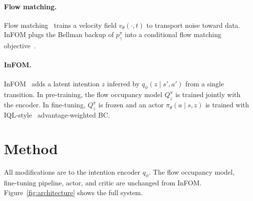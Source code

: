 \documentclass{article}
\newcommand{\base}{InFOM}
\begin{document}
\paragraph{Flow matching.}
Flow matching~\citep{lipman2023flow,liu2023rectified,albergo2023stochastic}
trains a velocity field $v_\theta(\cdot,t)$ to transport noise toward data.
\base{} plugs the Bellman backup of $p^\pi_\gamma$ into a conditional
flow matching objective~\citep{farebrother2025tdflows,ma2023vip}.

\paragraph{InFOM.}
\base{}~\citep{zheng2025infom} adds a latent intention $z$
inferred by $q_\phi(z \mid s',a')$ from a single transition.
In pre-training, the flow occupancy model $Q^\pi_z$ is trained jointly
with the encoder.
In fine-tuning, $Q^\pi_z$ is frozen and an actor
$\pi_\theta(a \mid s, z)$ is trained with IQL-style~\citep{kostrikov2021iql}
advantage-weighted BC.

\section{Method}
\label{sec:method}

All modifications are to the intention encoder $q_\phi$.
The flow occupancy model, fine-tuning pipeline, actor, and critic
are unchanged from \base{}.
Figure~\ref{fig:architecture} shows the full system.
\end{document}
